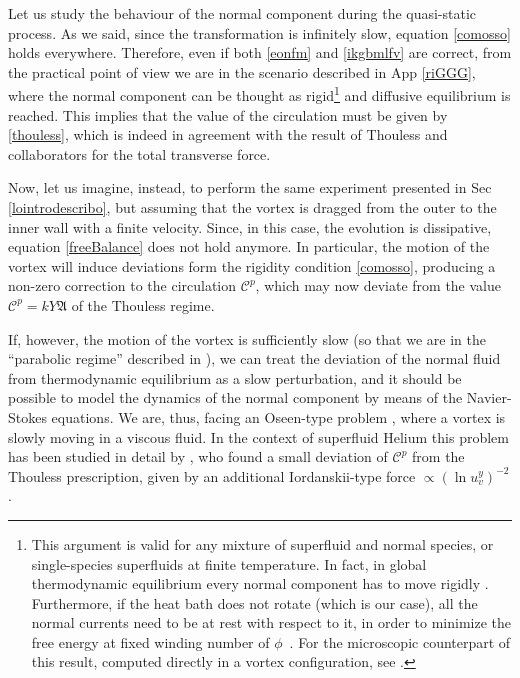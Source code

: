 \documentclass[preprints,article,accept,moreauthors,pdftex]{mdpi}
\begin{document}
Let us study the behaviour of the normal component during the quasi-static process. 
As we said, since the transformation is infinitely slow, equation \eqref{comosso} holds everywhere. 
Therefore, even if both \eqref{eonfm} and \eqref{ikgbmlfv} are correct, from the practical point of view we are in the scenario described in App \ref{riGGG}, where the normal component can be thought as rigid\footnote{
This argument is valid for any mixture of superfluid and normal species, or single-species superfluids at finite temperature. In fact, in global thermodynamic equilibrium every normal component has to move rigidly \citep{Prix_single_vortex,Carter_Prix_Magnus}. 
Furthermore, if the heat bath does not rotate (which is our case), all the normal currents need to be at rest with respect to it, in order to minimize the free energy  at fixed winding number of  $\phi$~\cite{khalatnikov_book,Termo}. For the microscopic counterpart of this result, computed directly in a vortex configuration, see \cite{wexler1996effective}.
} and diffusive equilibrium is reached. 
This implies that the value of the circulation must be given by \eqref{thouless}, which is indeed in agreement with the result of Thouless and collaborators for the total transverse force. 

Now, let us imagine, instead, to perform the same experiment presented in Sec \ref{lointrodescribo}, but assuming that the vortex is dragged from the outer to the inner wall with a finite velocity. Since, in this case, the evolution is dissipative, equation \eqref{freeBalance} does not hold anymore. In particular, the motion of the vortex will induce deviations form the rigidity condition \eqref{comosso}, producing a non-zero correction to the circulation  $\mathcal{C}^p$, which may now deviate from the value  $\mathcal{C}^p=k Y \mathfrak{A}$ of the Thouless regime. 

If, however, the motion of the vortex is sufficiently slow (so that we are in the ``parabolic regime'' described in  \cite{gavassino2020bulk}), we can treat the deviation of the normal fluid from thermodynamic equilibrium as a slow perturbation, and it should be possible to model the dynamics of the normal component by means of the Navier-Stokes equations. 
We are, thus, facing an Oseen-type problem \cite{sonin_book_2016}, where a vortex is slowly moving in a viscous fluid. In the context of superfluid Helium this problem has been studied in detail by \citet{Thouless2001}, who found a small deviation of $\mathcal{C}^p$ from the Thouless prescription, given by an additional Iordanskii-type force $\propto (\ln u_v^y)^{-2}$.  
\end{document}
